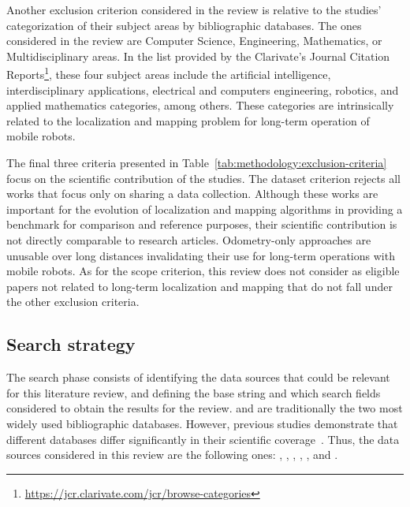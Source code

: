 Another exclusion criterion considered in the review is relative to the studies' categorization of their subject areas by bibliographic databases. The ones considered in the review are Computer Science, Engineering, Mathematics, or Multidisciplinary areas. In the list provided by the Clarivate's Journal Citation Reports\footnote{\url{https://jcr.clarivate.com/jcr/browse-categories}}, these four subject areas include the artificial intelligence, interdisciplinary applications, electrical and computers engineering, robotics, and applied mathematics categories, among others. These categories are intrinsically related to the localization and mapping problem for long-term operation of mobile robots.

The final three criteria presented in Table~\ref{tab:methodology:exclusion-criteria} focus on the scientific contribution of the studies. The dataset criterion rejects all works that focus only on sharing a data collection. Although these works are important for the evolution of localization and mapping algorithms in providing a benchmark for comparison and reference purposes, their scientific contribution is not directly comparable to research articles. Odometry-only approaches are unusable over long distances invalidating their use for long-term operations with mobile robots. As for the scope criterion, this review does not consider as eligible papers not related to long-term localization and mapping that do not fall under the other exclusion criteria.

\subsection{Search strategy}
\label{sec:methodology:search}

The search phase consists of identifying the data sources that could be relevant for this literature review, and defining the base string and which search fields considered to obtain the results for the review.  and  are traditionally the two most widely used bibliographic databases. However, previous studies demonstrate that different databases differ significantly in their scientific coverage~\parencite{methodology:search:db:coverage:scopus-wos,methodology:search:db:coverage:dim-scopus-wos}. Thus, the data sources considered in this review are the following ones: , , , , , and .

